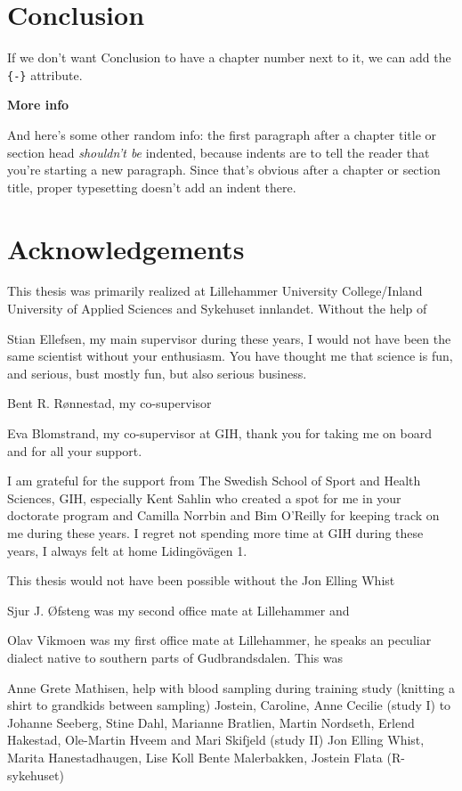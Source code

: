 \documentclass[twoside,10pt]{gihclass} %
\begin{document}
\hypertarget{conclusion}{%
\chapter*{Conclusion}\label{conclusion}}

If we don't want Conclusion to have a chapter number next to it, we can add the \texttt{\{-\}} attribute.

\textbf{More info}

And here's some other random info: the first paragraph after a chapter title or section head \emph{shouldn't be} indented, because indents are to tell the reader that you're starting a new paragraph. Since that's obvious after a chapter or section title, proper typesetting doesn't add an indent there.

\hypertarget{acknowledgements}{%
\chapter{Acknowledgements}\label{acknowledgements}}

This thesis was primarily realized at Lillehammer University College/Inland University of Applied Sciences and Sykehuset innlandet. Without the help of

Stian Ellefsen, my main supervisor during these years, I would not have been the same scientist without your enthusiasm. You have thought me that science is fun, and serious, bust mostly fun, but also serious business.

Bent R. Rønnestad, my co-supervisor

Eva Blomstrand, my co-supervisor at GIH, thank you for taking me on board and for all your support.

I am grateful for the support from The Swedish School of Sport and Health
Sciences, GIH, especially Kent Sahlin who created a spot for me in your doctorate program and Camilla Norrbin and Bim O'Reilly for keeping track on me during these years. I regret not spending more time at GIH during these years, I always felt at home Lidingövägen 1.

This thesis would not have been possible without the Jon Elling Whist

Sjur J. Øfsteng was my second office mate at Lillehammer and

Olav Vikmoen was my first office mate at Lillehammer, he speaks an peculiar dialect native to southern parts of Gudbrandsdalen. This was

Anne Grete Mathisen, help with blood sampling during training study (knitting a shirt to grandkids between sampling)
Jostein, Caroline, Anne Cecilie (study I)
to Johanne Seeberg, Stine Dahl, Marianne Bratlien, Martin Nordseth, Erlend Hakestad, Ole-Martin Hveem and Mari Skifjeld (study II)
Jon Elling Whist, Marita Hanestadhaugen, Lise Koll
Bente Malerbakken, Jostein Flata (R-sykehuset)
\end{document}
